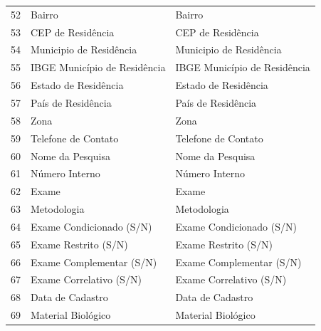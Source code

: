 \begin{table}
\begin{tabular}{lll}
52                                   & Bairro                           & Bairro                            \\
53                                   & CEP de Residência                & CEP de Residência                 \\
54                                   & Municipio de Residência          & Municipio de Residência           \\
55                                   & IBGE Município de Residência     & IBGE Município de Residência      \\
56                                   & Estado de Residência             & Estado de Residência              \\
57                                   & País de Residência               & País de Residência                \\
58                                   & Zona                             & Zona                              \\
59                                   & Telefone de Contato              & Telefone de Contato               \\
60                                   & Nome da Pesquisa                 & Nome da Pesquisa                  \\
61                                   & Número Interno                   & Número Interno                    \\
62                                   & Exame                            & Exame                             \\
63                                   & Metodologia                      & Metodologia                       \\
64                                   & Exame Condicionado (S/N)         & Exame Condicionado (S/N)          \\
65                                   & Exame Restrito (S/N)             & Exame Restrito (S/N)              \\
66                                   & Exame Complementar (S/N)         & Exame Complementar (S/N)          \\
67                                   & Exame Correlativo (S/N)          & Exame Correlativo (S/N)           \\
68                                   & Data de Cadastro                 & Data de Cadastro                  \\
69                                   & Material Biológico               & Material Biológico                \\

\end{tabular}
\end{table}
